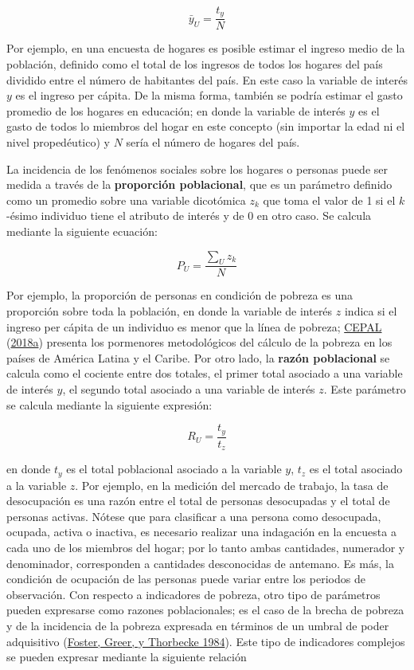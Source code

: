 \documentclass[
  12pt,
  spanish,
]{book}
\begin{document}
\[\bar{y}_U = \frac{t_y}{N}\]

Por ejemplo, en una encuesta de hogares es posible estimar el ingreso medio de la población, definido como el total de los ingresos de todos los hogares del país dividido entre el número de habitantes del país. En este caso la variable de interés \(y\) es el ingreso per cápita. De la misma forma, también se podría estimar el gasto promedio de los hogares en educación; en donde la variable de interés \(y\) es el gasto de todos lo miembros del hogar en este concepto (sin importar la edad ni el nivel propedéutico) y \(N\) sería el número de hogares del país.

La incidencia de los fenómenos sociales sobre los hogares o personas puede ser medida a través de la \textbf{proporción poblacional}, que es un parámetro definido como un promedio sobre una variable dicotómica \(z_k\) que toma el valor de 1 si el \(k\)-ésimo individuo tiene el atributo de interés y de 0 en otro caso. Se calcula mediante la siguiente ecuación:

\[P_U=\frac{\sum_U z_k}{N}\]

Por ejemplo, la proporción de personas en condición de pobreza es una proporción sobre toda la población, en donde la variable de interés \(z\) indica si el ingreso per cápita de un individuo es menor que la línea de pobreza; \protect\hyperlink{ref-CEPAL_2018}{CEPAL} (\protect\hyperlink{ref-CEPAL_2018}{2018a}) presenta los pormenores metodológicos del cálculo de la pobreza en los países de América Latina y el Caribe. Por otro lado, la \textbf{razón poblacional} se calcula como el cociente entre dos totales, el primer total asociado a una variable de interés \(y\), el segundo total asociado a una variable de interés \(z\). Este parámetro se calcula mediante la siguiente expresión:

\[R_U=\frac{t_y}{t_z}\]

en donde \(t_y\) es el total poblacional asociado a la variable \(y\), \(t_z\) es el total asociado a la variable \(z\). Por ejemplo, en la medición del mercado de trabajo, la tasa de desocupación es una razón entre el total de personas desocupadas y el total de personas activas. Nótese que para clasificar a una persona como desocupada, ocupada, activa o inactiva, es necesario realizar una indagación en la encuesta a cada uno de los miembros del hogar; por lo tanto ambas cantidades, numerador y denominador, corresponden a cantidades desconocidas de antemano. Es más, la condición de ocupación de las personas puede variar entre los periodos de observación. Con respecto a indicadores de pobreza, otro tipo de parámetros pueden expresarse como razones poblacionales; es el caso de la brecha de pobreza y de la incidencia de la pobreza expresada en términos de un umbral de poder adquisitivo (\protect\hyperlink{ref-Foster_Greer_Thorbecke_1984}{Foster, Greer, y Thorbecke 1984}). Este tipo de indicadores complejos se pueden expresar mediante la siguiente relación
\end{document}
